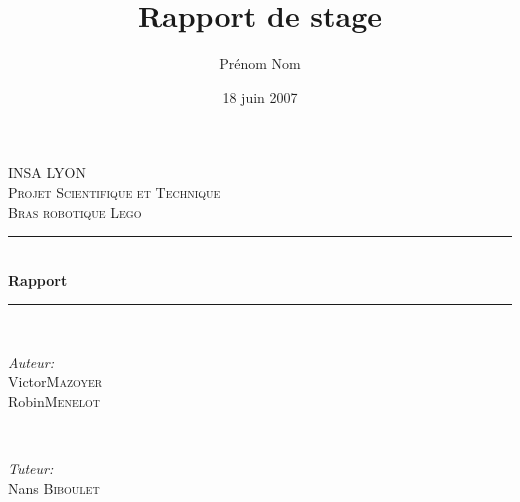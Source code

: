 \documentclass[a4paper, titlepage]{report}
\title{Rapport de stage}      %
\author{Prénom Nom}           %
\date{18 juin 2007}           %
\begin{document}
\begin{titlepage}

\newcommand{\HRule}{\rule{\linewidth}{0.5mm}} %

\center %
 

\textsc{\LARGE INSA LYON}\\[1.5cm] %
\textsc{\Large Projet Scientifique et Technique}\\[0.5cm] %
\textsc{\large Bras robotique Lego}\\[0.5cm] %


\HRule \\[0.4cm]
{ \huge \bfseries Rapport}\\[0.4cm] %
\HRule \\[1.5cm]
 

\begin{minipage}{0.4\textwidth}
\begin{flushleft} \large
\emph{Auteur:}\\
Victor\textsc{Mazoyer}\\ 
Robin\textsc{Menelot}
\end{flushleft}
\end{minipage}
~
\begin{minipage}{0.4\textwidth}
\begin{flushright} \large
\emph{Tuteur:} \\
Nans \textsc{Biboulet} 
\end{flushright}
\end{minipage}\\[4cm]



\end{titlepage}
\end{document}
